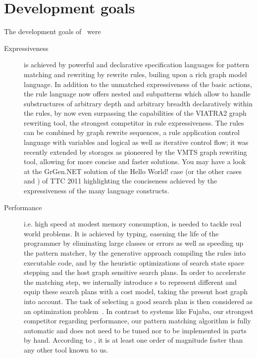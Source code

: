 \section{Development goals}

The development goals of \GrG\ were

\begin{description}

\item[Expressiveness]
is achieved by powerful and declarative specification languages for pattern matching and rewriting by rewrite rules, builing upon a rich graph model language.
In addition to the unmatched expressiveness of the basic actions,
the rule language now offers nested and subpatterns which allow to handle substructures of arbitrary depth and arbitrary breadth declaratively within the rules,
by now even surpassing the capabilities of the VIATRA2\cite{viatra2,recursiveviatra} graph rewriting tool, the strongest competitor in rule expressiveness.
The rules can be combined by graph rewrite sequences, a rule application control language with variables and logical as well as iterative control flow;
it was recently extended by storages as pioneered by the VMTS\cite{vmts} graph rewriting tool, allowing for more concise and faster solutions.
You may have a look at the GrGen.NET solution of the Hello World! case \cite{HelloWorld} (or the other cases \cite{ProgramUnderstanding} and \cite{CompilerOptimization}) of TTC 2011 highlighting the conciseness achieved by the expressiveness of the many language constructs.

\item[Performance]
i.e. high speed at modest memory consumption, is needed to tackle real world problems.
It is achieved by typing, easening the life of the programmer by eliminating large classes or errors as well as speeding up the pattern matcher,
by the generative approach compiling the rules into executable code,
and by the heuristic optimizations of search state space stepping and the host graph sensitive search plans.
In order to accelerate the matching step, we internally introduce s
to represent different  and equip these search plans with a cost model, taking the present host graph into account.
The task of selecting a good search plan is then considered as an optimization problem~\cite{BKG:07,Bat:06}.
In contrast to systems like Fujaba\cite{fujaba,fuj}, our strongest competitor regarding performance,
our pattern matching algorithm is fully automatic and does not need to be tuned nor to be implemented in parts by hand.
According to \cite{varro_bench}, it is at least one order of magnitude faster than any other tool known to us.


\end{description}
